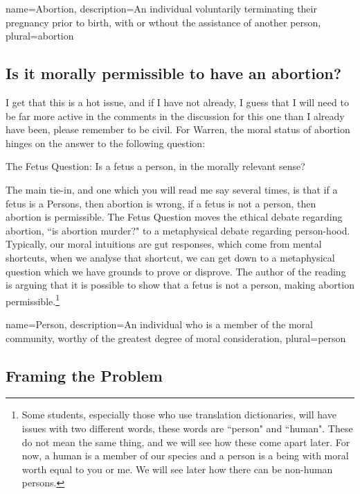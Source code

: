 {
  name=Abortion,
  description={An individual voluntarily terminating their pregnancy prior to birth, with or wthout the assistance of another person},
  plural=abortion
}


\subsection{Is it morally permissible to have an abortion?}

I get that this is a hot issue, and if I have not already, I guess that I will need to be far more active in the comments in the discussion for this one than I already have been, please remember to be civil. For Warren, the moral status of abortion hinges on the answer to the following question:

\begin{center}
The Fetus Question: Is a fetus a person, in the morally relevant sense?
\end{center}

The main tie-in, and one which you will read me say several times, is that if a fetus is a \glspl{Person}, then abortion is wrong, if a fetus is not a person, then abortion is permissible. The Fetus Question moves the ethical debate regarding abortion, ``is abortion murder?" to a metaphysical debate regarding person-hood. Typically, our moral intuitions are gut responses, which come from mental shortcuts, when we analyse that shortcut, we can get down to a metaphysical question which we have grounds to prove or disprove. The author of the reading is arguing that it is possible to show that a fetus is not a person, making abortion permissible.\footnote{Some students, especially those who use translation dictionaries, will have issues with two different words, these words are ``person" and ``human". These do not mean the same thing, and we will see how these come apart later. For now, a human is a member of our species and a person is a being with moral worth equal to you or me. We will see later how there can be non-human persons.} 

{
  name=Person,
  description={An individual who is a member of the moral community, worthy of the greatest degree of moral consideration},
  plural=person
}


\subsection{Framing the Problem}

